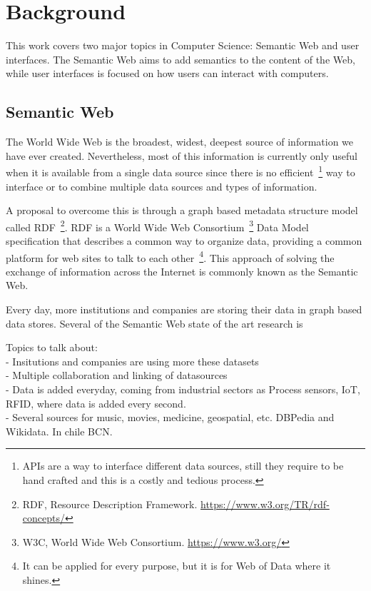 \chapter{Background}

This work covers two major topics in Computer Science: Semantic Web and user interfaces. The Semantic Web aims to add semantics to the content of the Web, while user interfaces is focused on how users can interact with computers.

\section{Semantic Web}

The World Wide Web is the broadest, widest, deepest source of information we have ever created. 
Nevertheless, most of this information is currently only useful when it is available from a single data source since there is no efficient~\footnote{APIs are a way to interface different data sources, still they require to be hand crafted and this is a costly and tedious process.} way to interface or to combine multiple data sources and types of information. \cite{W3CDesignIssues}

A proposal to overcome this is through a graph based metadata structure model called RDF~\footnote{RDF, Resource Description Framework. \url{https://www.w3.org/TR/rdf-concepts/}}.
RDF is a World Wide Web Consortium~\footnote{W3C, World Wide Web Consortium. \url{https://www.w3.org/}} Data Model specification that describes a common way to organize data, providing a common platform for web sites to talk to each other~\footnote{It can be applied for every purpose, but it is for Web of Data where it shines.}. 
This approach of solving the exchange of information across the Internet is commonly known as the Semantic Web.

Every day, more institutions and companies are storing their data in graph based data stores. Several of the Semantic Web state of the art research is 

Topics to talk about:\\
- Insitutions and companies are using more these datasets\\
- Multiple collaboration and linking of datasources\\
- Data is added everyday, coming from industrial sectors as Process sensors, IoT, RFID, where data is added every second.\\
- Several sources for music, movies, medicine, geospatial, etc. DBPedia and Wikidata. In chile BCN.

